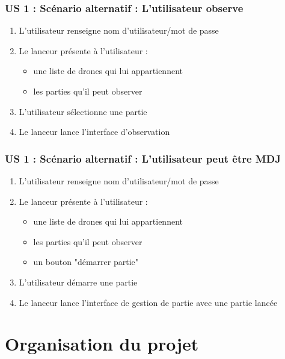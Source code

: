 \documentclass{scrartcl}
\begin{document}
\subsubsection*{US 1 : Scénario alternatif : L'utilisateur observe}
\begin{enumerate}
    \item L'utilisateur renseigne nom d'utilisateur/mot de passe
    \item Le lanceur présente à l'utilisateur :
        \begin{itemize}
            \item une liste de drones qui lui appartiennent
            \item les parties qu'il peut observer
        \end{itemize}
    \item L'utilisateur sélectionne une partie
    \item Le lanceur lance l'interface d'observation
\end{enumerate}

\subsubsection*{US 1 : Scénario alternatif : L'utilisateur peut être MDJ}
\begin{enumerate}
    \item L'utilisateur renseigne nom d'utilisateur/mot de passe
    \item Le lanceur présente à l'utilisateur :
        \begin{itemize}
            \item une liste de drones qui lui appartiennent
            \item les parties qu'il peut observer
            \item un bouton "démarrer partie"
        \end{itemize}
    \item L'utilisateur démarre une partie
    \item Le lanceur lance l'interface de gestion de partie avec une partie lancée
\end{enumerate}

\section{Organisation du projet}
\end{document}
